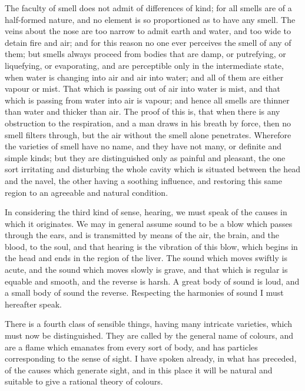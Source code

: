 \documentclass[11pt,letter]{article}
\begin{document}
\par  The faculty of smell does not admit of differences of kind; for all smells are of a half-formed nature, and no element is so proportioned as to have any smell. The veins about the nose are too narrow to admit earth and water, and too wide to detain fire and air; and for this reason no one ever perceives the smell of any of them; but smells always proceed from bodies that are damp, or putrefying, or liquefying, or evaporating, and are perceptible only in the intermediate state, when water is changing into air and air into water; and all of them are either vapour or mist. That which is passing out of air into water is mist, and that which is passing from water into air is vapour; and hence all smells are thinner than water and thicker than air. The proof of this is, that when there is any obstruction to the respiration, and a man draws in his breath by force, then no smell filters through, but the air without the smell alone penetrates. Wherefore the varieties of smell have no name, and they have not many, or definite and simple kinds; but they are distinguished only as painful and pleasant, the one sort irritating and disturbing the whole cavity which is situated between the head and the navel, the other having a soothing influence, and restoring this same region to an agreeable and natural condition.

\par  In considering the third kind of sense, hearing, we must speak of the causes in which it originates. We may in general assume sound to be a blow which passes through the ears, and is transmitted by means of the air, the brain, and the blood, to the soul, and that hearing is the vibration of this blow, which begins in the head and ends in the region of the liver. The sound which moves swiftly is acute, and the sound which moves slowly is grave, and that which is regular is equable and smooth, and the reverse is harsh. A great body of sound is loud, and a small body of sound the reverse. Respecting the harmonies of sound I must hereafter speak.

\par  There is a fourth class of sensible things, having many intricate varieties, which must now be distinguished. They are called by the general name of colours, and are a flame which emanates from every sort of body, and has particles corresponding to the sense of sight. I have spoken already, in what has preceded, of the causes which generate sight, and in this place it will be natural and suitable to give a rational theory of colours.
\end{document}
